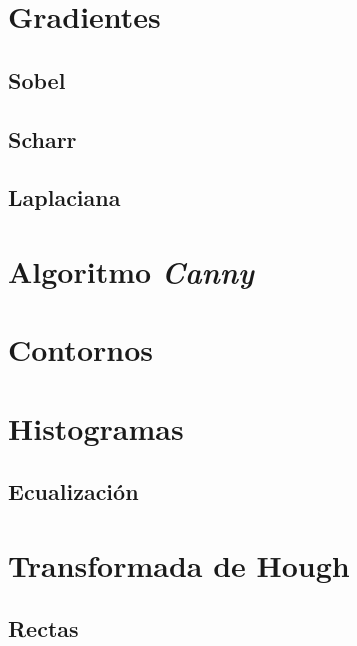 \section{Gradientes}
\subsection{Sobel}
\subsection{Scharr}
\subsection{Laplaciana}

\section{Algoritmo \emph{Canny}}

\section{Contornos}

\section{Histogramas}
\subsection{Ecualización}

\section{Transformada de Hough}
\subsection{Rectas}